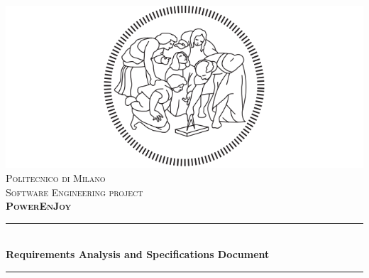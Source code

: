\documentclass[a4paper,10pt]{article}
\newcommand{\RomanNumber}[1]{\uppercase\expandafter{\romannumeral #1\relax}}
\begin{document}
\begin{titlepage}
\newcommand{\HRule}{\rule{\linewidth}{0.5mm}} %

\center %
 
\includegraphics[scale=0.3]{logo_poli.png}\\[0.5cm] %
\textsc{\LARGE Politecnico di Milano}\\[2cm] %
\textsc{\Large Software Engineering \RomanNumber{2} project}\\[0.5cm] %
\textsc{\large \textbf{PowerEnJoy}}\\[1.5cm] %


\HRule \\[0.4cm]
{ \huge \bfseries Requirements Analysis and Specifications Document}\\[0.4cm] %
\HRule \\[1.5cm]
 


\end{titlepage}
\end{document}
